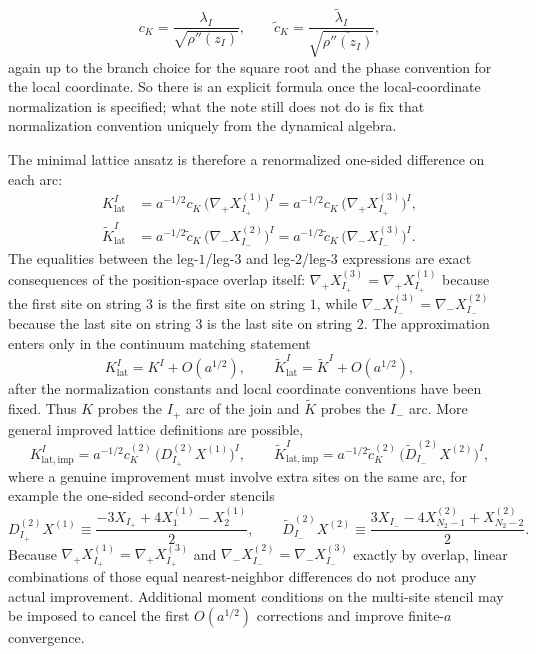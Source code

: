 \documentclass[11pt]{article}
\numberwithin{equation}{section}
\begin{document}
\begin{equation}
\label{eq:s14-015}
c_K = \frac{\lambda_I}{\sqrt{\rho''(z_I)}},
\qquad
\widetilde c_K = \frac{\widetilde\lambda_I}{\sqrt{\overline{\rho''(z_I)}}},
\end{equation}
again up to the branch choice for the square root and the phase convention for the local coordinate. So there is an explicit formula once the local-coordinate normalization is specified; what the note still does not do is fix that normalization convention uniquely from the dynamical algebra.

The minimal lattice ansatz is therefore a renormalized one-sided difference on each arc:
\begin{equation}
\label{eq:s14-016}
\begin{aligned}
K^I_{\mathrm{lat}}
&=
a^{-1/2}c_K\,\bigl(\nabla_+ X_{I_+}^{(1)}\bigr)^I
=
a^{-1/2}c_K\,\bigl(\nabla_+ X_{I_+}^{(3)}\bigr)^I,\\
\widetilde K^I_{\mathrm{lat}}
&=
a^{-1/2}\widetilde c_K\,\bigl(\nabla_- X_{I_-}^{(2)}\bigr)^I
=
a^{-1/2}\widetilde c_K\,\bigl(\nabla_- X_{I_-}^{(3)}\bigr)^I.
\end{aligned}
\end{equation}
The equalities between the leg-$1$/leg-$3$ and leg-$2$/leg-$3$ expressions are exact consequences of the position-space overlap itself: $\nabla_+X_{I_+}^{(3)}=\nabla_+X_{I_+}^{(1)}$ because the first site on string $3$ is the first site on string $1$, while $\nabla_-X_{I_-}^{(3)}=\nabla_-X_{I_-}^{(2)}$ because the last site on string $3$ is the last site on string $2$. The approximation enters only in the continuum matching statement
\begin{equation}
\label{eq:s14-017}
K^I_{\mathrm{lat}}=K^I+O(a^{1/2}),
\qquad
\widetilde K^I_{\mathrm{lat}}=\widetilde K^I+O(a^{1/2}),
\end{equation}
after the normalization constants and local coordinate conventions have been fixed. Thus $K$ probes the $I_+$ arc of the join and $\widetilde K$ probes the $I_-$ arc. More general improved lattice definitions are possible,
\begin{equation}
\label{eq:s14-018}
K^I_{\mathrm{lat,imp}}
=
a^{-1/2}c_K^{(2)}\,\bigl(D^{(2)}_{I_+}X^{(1)}\bigr)^I,
\qquad
\widetilde K^I_{\mathrm{lat,imp}}
=
a^{-1/2}\widetilde c_K^{(2)}\,\bigl(\widetilde D^{(2)}_{I_-}X^{(2)}\bigr)^I,
\end{equation}
where a genuine improvement must involve extra sites on the same arc, for example the one-sided second-order stencils
\begin{equation}
\label{eq:s14-019}
D^{(2)}_{I_+}X^{(1)} \equiv \frac{-3X_{I_+}+4X_1^{(1)}-X_2^{(1)}}{2},
\qquad
\widetilde D^{(2)}_{I_-}X^{(2)} \equiv \frac{3X_{I_-}-4X_{N_2-1}^{(2)}+X_{N_2-2}^{(2)}}{2}.
\end{equation}
Because $\nabla_+X_{I_+}^{(1)}=\nabla_+X_{I_+}^{(3)}$ and $\nabla_-X_{I_-}^{(2)}=\nabla_-X_{I_-}^{(3)}$ exactly by overlap, linear combinations of those equal nearest-neighbor differences do not produce any actual improvement. Additional moment conditions on the multi-site stencil may be imposed to cancel the first $O(a^{1/2})$ corrections and improve finite-$a$ convergence.
\end{document}
